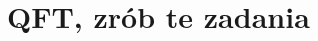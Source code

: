 \documentclass[a4paper,11pt]{article}
\begin{document}
\begin{enumerate}








\end{enumerate}










\section{QFT, zrób te zadania}


\end{document}
